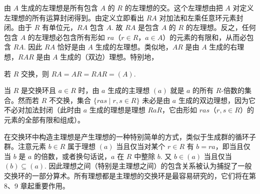 由 \(A\) 生成的左理想是所有包含 \(A\) 的 \(R\) 的左理想的交。这个左理想由把 \(A\) 对定义左理想的所有运算封闭得到。由定义立即看出 \(RA\) 对加法和左乘任意环元素封闭。由于 \(R\) 有单位元，\(RA\) 包含 \(A\). 故 \(RA\) 是包含 \(A\) 的 \(R\) 的左理想。反之，任何包含 \(A\) 的左理想必包含所有形如 \(ra\)（\(r \in R\)，\(a \in A\)）的元素的有限和，从而必包含 \(RA\). 因此 \(RA\) 恰好是由 \(A\) 生成的左理想。类似地，\(AR\) 是由 \(A\) 生成的右理想，\(RAR\) 是由 \(A\) 生成的（双边）理想。特别地，
\begin{center}
若 \(R\) 交换，则 \(RA = AR = RAR = (A)\).
\end{center}

当 \(R\) 是交换环且 \(a \in R\) 时，由 \(a\) 生成的主理想 \((a)\) 就是 \(a\) 的所有 \(R\)-倍数的集合。然而若 \(R\) 不交换，集合 \(\{ras \mid r, s \in R\}\) 未必是由 \(a\) 生成的双边理想，因为它不必对加法封闭（此时由 \(a\) 生成的理想是理想 \(RaR\)，它由形如 \(ras\)（\(r, s \in R\)）的元素的全部有限和组成）。

在交换环中构造主理想是产生理想的一种特别简单的方式，类似于生成群的循环子群。注意元素 \(b \in R\) 属于理想 \((a)\) 当且仅当对某个 \(r \in R\) 有 \(b = ra\)，即当且仅当 \(b\) 是 \(a\) 的倍数，或者换句话说，\(a\) 在 \(R\) 中整除 \(b\). 又 \(b \in (a)\) 当且仅当 \((b) \subseteq (a)\). 因此理想之间（特别是主理想之间）的包含关系被认为捕捉了一般交换环的一部分算术。所有理想都是主理想的交换环是最容易研究的，它们将在第 8、9 章起重要作用。

